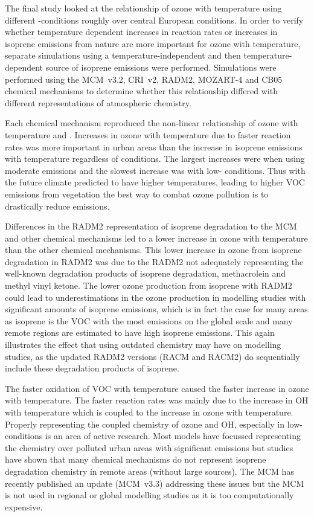 The final study looked at the relationship of ozone with temperature using different -conditions roughly over central European conditions.
In order to verify whether temperature dependent increases in reaction rates or increases in isoprene emissions from nature are more important for ozone with temperature, separate simulations using a temperature-independent and then temperature-dependent source of isoprene emissions were performed.
Simulations were performed using the MCM~v3.2, CRI~v2, RADM2, MOZART-4 and CB05 chemical mechanisms to determine whether this relationship differed with different representations of atmospheric chemistry.

Each chemical mechanism reproduced the non-linear relationship of ozone with temperature and .
Increases in ozone with temperature due to faster reaction rates was more important in urban areas than the increase in isoprene emissions with temperature regardless of  conditions.
The largest increases were when using moderate  emissions and the slowest increase was with low- conditions.
Thus with the future climate predicted to have higher temperatures, leading to higher VOC emissions from vegetation the best way to combat ozone pollution is to drastically reduce  emissions.

Differences in the RADM2 representation of isoprene degradation to the MCM and other chemical mechanisms led to a lower increase in ozone with temperature than the other chemical mechanisms.
This lower increase in ozone from isoprene degradation in RADM2 was due to the RADM2 not adequately representing the well-known degradation products of isoprene degradation, methacrolein and methyl vinyl ketone.
The lower ozone production from isoprene with RADM2 could lead to underestimations in the ozone production in modelling studies with significant amounts of isoprene emissions, which is in fact the case for many areas as isoprene is the VOC with the most emissions on the global scale and many remote regions are estimated to have high isoprene emissions.
This again illustrates the effect that using outdated chemistry may have on modelling studies, as the updated RADM2 versions (RACM and RACM2) do sequentially include these degradation products of isoprene.

The faster oxidation of VOC with temperature caused the faster increase in ozone with temperature.
The faster reaction rates was mainly due to the increase in OH with temperature which is coupled to the increase in ozone with temperature.
Properly representing the coupled chemistry of ozone and OH, especially in low- conditions is an area of active research.
Most models have focussed representing the chemistry over polluted urban areas with significant  emissions but studies have shown that many chemical mechanisms do not represent isoprene degradation chemistry in remote areas (without large  sources).
The MCM has recently published an update (MCM~v3.3) addressing these issues but the MCM is not used in regional or global modelling studies as it is too computationally expensive.

